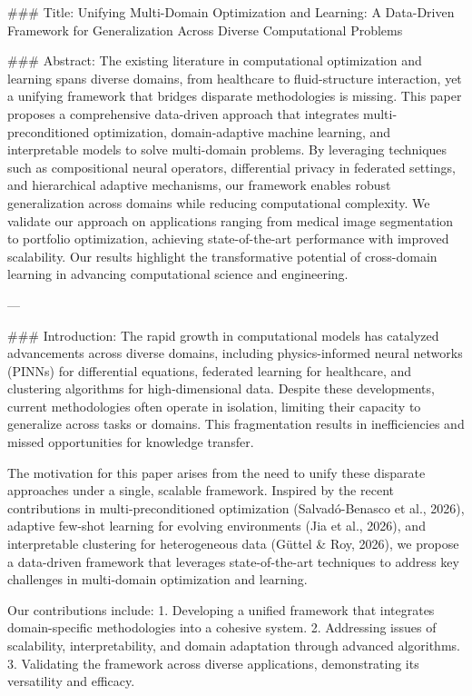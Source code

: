 ### Title:  
Unifying Multi-Domain Optimization and Learning: A Data-Driven Framework for Generalization Across Diverse Computational Problems  

### Abstract:  
The existing literature in computational optimization and learning spans diverse domains, from healthcare to fluid-structure interaction, yet a unifying framework that bridges disparate methodologies is missing. This paper proposes a comprehensive data-driven approach that integrates multi-preconditioned optimization, domain-adaptive machine learning, and interpretable models to solve multi-domain problems. By leveraging techniques such as compositional neural operators, differential privacy in federated settings, and hierarchical adaptive mechanisms, our framework enables robust generalization across domains while reducing computational complexity. We validate our approach on applications ranging from medical image segmentation to portfolio optimization, achieving state-of-the-art performance with improved scalability. Our results highlight the transformative potential of cross-domain learning in advancing computational science and engineering.

---

### Introduction:  
The rapid growth in computational models has catalyzed advancements across diverse domains, including physics-informed neural networks (PINNs) for differential equations, federated learning for healthcare, and clustering algorithms for high-dimensional data. Despite these developments, current methodologies often operate in isolation, limiting their capacity to generalize across tasks or domains. This fragmentation results in inefficiencies and missed opportunities for knowledge transfer.

The motivation for this paper arises from the need to unify these disparate approaches under a single, scalable framework. Inspired by the recent contributions in multi-preconditioned optimization (Salvadó-Benasco et al., 2026), adaptive few-shot learning for evolving environments (Jia et al., 2026), and interpretable clustering for heterogeneous data (Güttel & Roy, 2026), we propose a data-driven framework that leverages state-of-the-art techniques to address key challenges in multi-domain optimization and learning.

Our contributions include:  
1. Developing a unified framework that integrates domain-specific methodologies into a cohesive system.  
2. Addressing issues of scalability, interpretability, and domain adaptation through advanced algorithms.  
3. Validating the framework across diverse applications, demonstrating its versatility and efficacy.

